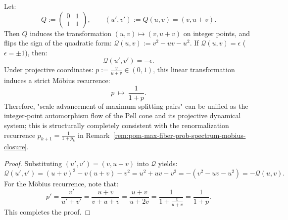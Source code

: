 \begin{proposition}\label{prop:pom-pell-cone-automorphism-mobius}
Let:
\[
Q:=\begin{pmatrix}0&1\\ 1&1\end{pmatrix},
\qquad
(u',v'):=Q(u,v)=(v,u+v).
\]
Then $Q$ induces the transformation $(u,v)\mapsto(v,u+v)$ on integer points, and flips the sign of the quadratic form:
\(
\mathcal{Q}(u,v):=v^2-uv-u^2
\).
If $\mathcal{Q}(u,v)=\epsilon$ ($\epsilon=\pm 1$), then:
\[
\boxed{\;\mathcal{Q}(u',v')=-\epsilon.\;}
\]
Under projective coordinates:
\(
p:=\frac{v}{u+v}\in(0,1)
\),
this linear transformation induces a strict Möbius recurrence:
\[
\boxed{\;p\ \longmapsto\ \frac{1}{1+p}.\;}
\]
Therefore, "scale advancement of maximum splitting pairs" can be unified as the integer-point automorphism flow of the Pell cone and its projective dynamical system;
this is structurally completely consistent with the renormalization recurrence $p_{k+1}=\frac{1}{1+p_k}$ in Remark~\ref{rem:pom-max-fiber-prob-spectrum-mobius-closure}.
\end{proposition}
\begin{proof}
Substituting $(u',v')=(v,u+v)$ into $\mathcal{Q}$ yields:
\[
\mathcal{Q}(u',v')
=(u+v)^2-v(u+v)-v^2
=u^2+uv-v^2
=-(v^2-uv-u^2)
=-\mathcal{Q}(u,v).
\]
For the Möbius recurrence, note that:
\[
p'=\frac{v'}{u'+v'}=\frac{u+v}{v+u+v}=\frac{u+v}{u+2v}
=\frac{1}{1+\frac{v}{u+v}}=\frac{1}{1+p}.
\]
This completes the proof.
\end{proof}
\endinput
